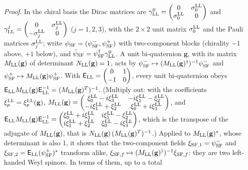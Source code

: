 \documentclass[
  10pt,
]{article}
\begin{document}
\emph{Proof.} In the chiral basis the Dirac matrices are
\(\gamma^0_{\rm LL}=\begin{pmatrix}0&\sigma^{\rm LL}_0\\\sigma^{\rm LL}_0&0\end{pmatrix}\)
and
\(\gamma^j_{\rm LL}=\begin{pmatrix}0&\sigma^{\rm LL}_j\\-\sigma^{\rm LL}_j&0\end{pmatrix}\)
(\(j=1,2,3\)), with the \(2\times2\) unit matrix \(\sigma^{\rm LL}_0\)
and the Pauli matrices \(\sigma^{\rm LL}_j\); write
\(\psi_{\rm SF}=(\psi^-_{\rm SF},\psi^+_{\rm SF})\) with two-component
blocks (chirality \(-1\) above, \(+1\) below), and
\(\bar\psi_{\rm SF}=\psi_{\rm SF}^\dagger\gamma^0_{\rm LL}\). A unit
bi-quaternion \(\mathbf g\), with its matrix \(M_{\rm LL}(\mathbf g)\)
of determinant \(N_{\rm LL}(\mathbf g)=1\), acts by
\(\psi^-_{\rm SF}\mapsto(M_{\rm LL}(\mathbf g)^\dagger)^{-1}\psi^-_{\rm SF}\)
and \(\psi^+_{\rm SF}\mapsto M_{\rm LL}(\mathbf g)\psi^+_{\rm SF}\).
With \(\mathsf E_{\rm LL}=\begin{pmatrix}0&1\\-1&0\end{pmatrix}\), every
unit bi-quaternion obeys
\(\mathsf E_{\rm LL}M_{\rm LL}(\mathbf g)\mathsf E_{\rm LL}^{-1}=(M_{\rm LL}(\mathbf g)^T)^{-1}\).
(Multiply out: with the coefficients
\(\xi^{\rm LL}_p=\xi^{\rm LL}_p(\mathbf g)\),
\(M_{\rm LL}(\mathbf g)=\begin{pmatrix}\xi^{\rm LL}_0-i\xi^{\rm LL}_3&-i\xi^{\rm LL}_1-\xi^{\rm LL}_2\\-i\xi^{\rm LL}_1+\xi^{\rm LL}_2&\xi^{\rm LL}_0+i\xi^{\rm LL}_3\end{pmatrix}\),
and
\(\mathsf E_{\rm LL}M_{\rm LL}(\mathbf g)\mathsf E_{\rm LL}^{-1}=\begin{pmatrix}\xi^{\rm LL}_0+i\xi^{\rm LL}_3&i\xi^{\rm LL}_1-\xi^{\rm LL}_2\\i\xi^{\rm LL}_1+\xi^{\rm LL}_2&\xi^{\rm LL}_0-i\xi^{\rm LL}_3\end{pmatrix}\),
which is the transpose of the adjugate of \(M_{\rm LL}(\mathbf g)\),
that is \(N_{\rm LL}(\mathbf g)\,(M_{\rm LL}(\mathbf g)^T)^{-1}\).)
Applied to \(M_{\rm LL}(\mathbf g)^*\), whose determinant is also 1, it
shows that the two-component fields \(\xi_{{\rm SF},1}=\psi^-_{\rm SF}\)
and \(\xi_{{\rm SF},2}=\mathsf E_{\rm LL}(\psi^+_{\rm SF})^*\) transform
alike,
\(\xi_{{\rm SF},f}\mapsto(M_{\rm LL}(\mathbf g)^\dagger)^{-1}\xi_{{\rm SF},f}\):
they are two left-handed Weyl spinors. In terms of them, up to a total
\end{document}
